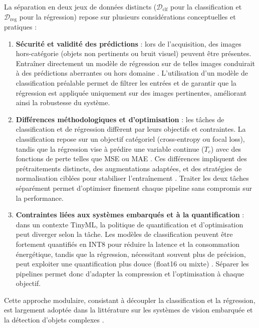La séparation en deux jeux de données distincts (\(\mathcal{D}_{\text{clf}}\) pour la classification et \(\mathcal{D}_{\text{reg}}\) pour la régression) repose sur plusieurs considérations conceptuelles et pratiques :
\begin{enumerate}
	\item \textbf{Sécurité et validité des prédictions} : lors de l'acquisition, des images hors-catégorie (objets non pertinents ou bruit visuel) peuvent être présentes. Entraîner directement un modèle de régression sur de telles images conduirait à des prédictions aberrantes ou hors domaine \cite{zhang2018generalized}. L'utilisation d'un modèle de classification préalable permet de filtrer les entrées et de garantir que la régression est appliquée uniquement sur des images pertinentes, améliorant ainsi la robustesse du système.

	\item \textbf{Différences méthodologiques et d'optimisation} : les tâches de classification et de régression diffèrent par leurs objectifs et contraintes. La classification repose sur un objectif catégoriel (cross-entropy ou focal loss), tandis que la régression vise à prédire une variable continue (\(T_c\)) avec des fonctions de perte telles que MSE ou MAE \cite{goodfellow2016deep}. Ces différences impliquent des prétraitements distincts, des augmentations adaptées, et des stratégies de normalisation ciblées pour stabiliser l’entraînement \cite{lecun2015deep}. Traiter les deux tâches séparément permet d’optimiser finement chaque pipeline sans compromis sur la performance.

	\item \textbf{Contraintes liées aux systèmes embarqués et à la quantification} : dans un contexte TinyML, la politique de quantification et d’optimisation peut diverger selon la tâche. Les modèles de classification peuvent être fortement quantifiés en INT8 pour réduire la latence et la consommation énergétique, tandis que la régression, nécessitant souvent plus de précision, peut exploiter une quantification plus douce (float16 ou mixte) \cite{han2020tinyml}. Séparer les pipelines permet donc d’adapter la compression et l’optimisation à chaque objectif.
\end{enumerate}

Cette approche modulaire, consistant à découpler la classification et la régression, est largement adoptée dans la littérature sur les systèmes de vision embarquée et la détection d’objets complexes \cite{redmon2016you,liu2016ssd}.


